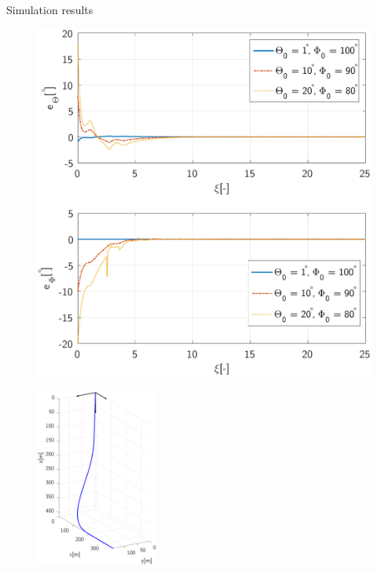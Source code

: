 \documentclass{beamer}
\begin{document}
\begin{frame}{Simulation results}
\begin{figure}[t]
	\centering
	\begin{minipage}[b]{0.5\textwidth}
		\centering
		\includegraphics[height=1.1\textwidth]{ErrorsNeutral.pdf}
		\label{fig:ReferenceTrajectoryThetaPhi} 
	\end{minipage}
	\begin{minipage}[b]{0.45\textwidth}
		\centering
		\includegraphics[height=2.3in]{ReferenceTrajectory.pdf}
		\label{fig:ReferenceTrajectoryV} 
	\end{minipage}
\end{figure}
\end{frame}
\end{document}
